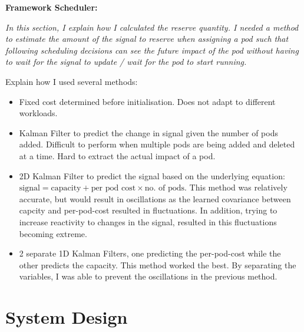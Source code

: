 \begin{tcolorbox}[boxsep=0mm,left=2.5mm,right=2.5mm]
    \textbf{Framework Scheduler:} {\em In this section, I explain how I
    calculated the reserve quantity. I needed a method to estimate the amount of
    the signal to reserve when assigning a pod such that following scheduling
    decisions can see the future impact of the pod without having to wait for
    the signal to update / wait for the pod to start running.

    Explain how I used several methods:
    \begin{itemize}
        \item Fixed cost determined before initialisation. Does not adapt to
            different workloads.
        \item Kalman Filter to predict the change in signal given the number of
            pods added. Difficult to perform when multiple pods are being added
            and deleted at a time. Hard to extract the actual impact of a pod.
        \item 2D Kalman Filter to predict the signal based on the underlying
            equation: $\text{signal} = \text{capacity} + \text{per pod cost} \times \text{no. of pods}$.
            This method was relatively accurate, but
            would result in oscillations as the learned covariance between
            capcity and per-pod-cost resulted in fluctuations. In addition,
            trying to increase reactivity to changes in the signal, resulted in
            this fluctuations becoming extreme.
        \item 2 separate 1D Kalman Filters, one predicting the per-pod-cost
            while the other predicts the capacity. This method worked the best.
            By separating the variables, I was able to prevent the oscillations
            in the previous method.
    \end{itemize}
    }
\end{tcolorbox}

\section{System Design}
